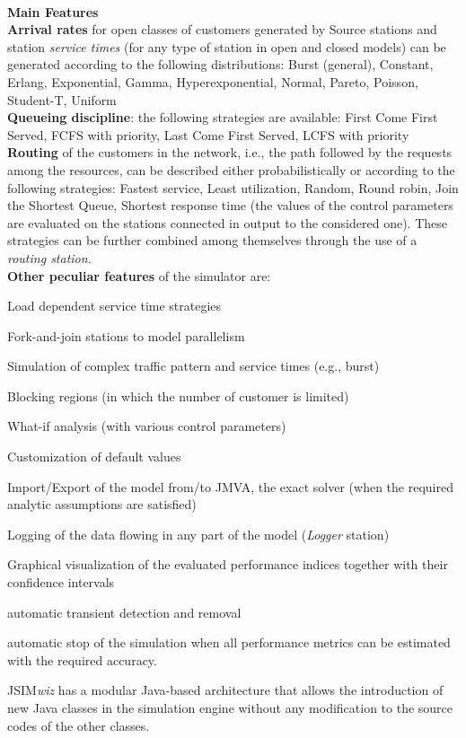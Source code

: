 \ \\
\noindent \textbf{\large Main Features}\\
\noindent \textbf{Arrival rates} for open classes of customers
generated by Source stations and station \emph{service times} (for
any type of station in open and closed models) can be generated
according to the following distributions: Burst (general),
Constant, Erlang, Exponential, Gamma, Hyperexponential, Normal,
Pareto, Poisson,
Student-T, Uniform \\

\noindent \textbf{Queueing discipline}: the following strategies
are available:  First Come First Served, FCFS with priority, Last
Come First Served, LCFS with priority\\

\noindent \textbf{Routing} of the customers in the network, i.e.,
the path followed by the requests among the resources, can be
described either probabilistically or according to the following
strategies: Fastest service, Least utilization, Random, Round
robin, Join the Shortest Queue, Shortest response time (the values
of the control parameters are evaluated on the stations connected
in output to the considered one). These strategies can be further
combined among themselves through the use of a \emph{routing
station}.\\

\noindent \textbf{Other peculiar features} of the simulator are:
\vspace{-0.2cm}
\begin{itemize*}
    \item Load dependent service time strategies
    \item Fork-and-join stations to model parallelism
    \item Simulation of complex traffic pattern and service times (e.g., burst)
    \item Blocking regions (in which the number of customer is limited)
    \item What-if analysis (with various control parameters)
    \item Customization of default values
    \item Import/Export of the model from/to JMVA, the exact solver (when
    the required analytic assumptions are satisfied)
    \item Logging of the data flowing in any part of the model
    (\emph{Logger} station)
    \item Graphical visualization of the evaluated performance
    indices together with their confidence intervals
    \item automatic transient detection and removal
    \item automatic stop of the simulation when all performance
    metrics can be estimated with the required accuracy.
\end{itemize*}
JSIM\emph{wiz} has a modular Java-based architecture that allows
the introduction of new Java classes in the simulation engine
without any modification to the source codes of the other classes.


